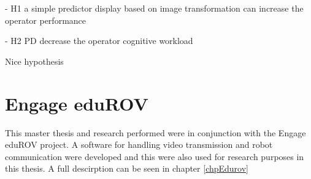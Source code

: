 - H1 a simple predictor display based on image transformation can 
 increase the operator performance
 
- H2 PD decrease the operator cognitive workload
 
\citep{Lu2018} Nice hypothesis

\section{Engage eduROV}

This master thesis and research performed were in conjunction with the Engage eduROV project. A software for handling video transmission and robot communication were developed and this were also used for research purposes in this thesis. A full descirption can be seen in chapter \ref{chpEdurov}

